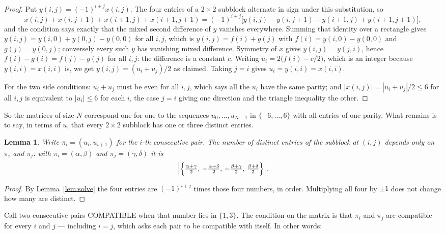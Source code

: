\documentclass[11pt,a4paper]{article}
\theoremstyle{plain}
\newtheorem{lemma}[theorem]{Lemma}
\theoremstyle{definition}
\begin{document}
\begin{proof}
Put $y(i,j)=(-1)^{i+j}x(i,j)$. The four entries of a $2\times2$ subblock alternate in sign
under this substitution, so
\[
x(i,j)+x(i,j{+}1)+x(i{+}1,j)+x(i{+}1,j{+}1)
=(-1)^{i+j}\bigl[y(i,j)-y(i,j{+}1)-y(i{+}1,j)+y(i{+}1,j{+}1)\bigr],
\]
and the condition says exactly that the mixed second difference of $y$ vanishes everywhere.
Summing that identity over a rectangle gives
$y(i,j)=y(i,0)+y(0,j)-y(0,0)$ for all $i,j$, which is $y(i,j)=f(i)+g(j)$ with
$f(i)=y(i,0)-y(0,0)$ and $g(j)=y(0,j)$; conversely every such $y$ has vanishing mixed
difference. Symmetry of $x$ gives $y(i,j)=y(j,i)$, hence $f(i)-g(i)=f(j)-g(j)$ for all $i,j$:
the difference is a constant $c$. Writing $u_i=2\bigl(f(i)-c/2\bigr)$, which is an integer
because $y(i,i)=x(i,i)$ is, we get $y(i,j)=(u_i+u_j)/2$ as claimed. Taking $j=i$ gives
$u_i=y(i,i)=x(i,i)$.

For the two side conditions: $u_i+u_j$ must be even for all $i,j$, which says all the $u_i$ have
the same parity; and $|x(i,j)|=|u_i+u_j|/2\le6$ for all $i,j$ is equivalent to $|u_i|\le6$
for each $i$, the case $j=i$ giving one direction and the triangle inequality the other.
\end{proof}

So the matrices of size $N$ correspond one for one to the sequences $u_0,\dots,u_{N-1}$ in
$\{-6,\dots,6\}$ with all entries of one parity. What remains is to say, in terms of $u$,
that every $2\times2$ subblock has one or three distinct entries.

\begin{lemma}\label{lem:block}
Write $\pi_i=(u_i,u_{i+1})$ for the $i$-th consecutive pair. The number of distinct entries of
the subblock at $(i,j)$ depends only on $\pi_i$ and $\pi_j$: with $\pi_i=(\alpha,\beta)$ and
$\pi_j=(\gamma,\delta)$ it is
\[
\Bigl|\Bigl\{\tfrac{\alpha+\gamma}{2},\,-\tfrac{\alpha+\delta}{2},\,
-\tfrac{\beta+\gamma}{2},\,\tfrac{\beta+\delta}{2}\Bigr\}\Bigr| .
\]
\end{lemma}

\begin{proof}
By Lemma~\ref{lem:solve} the four entries are $(-1)^{i+j}$ times those four numbers, in
order. Multiplying all four by $\pm1$ does not change how many are distinct.
\end{proof}

Call two consecutive pairs COMPATIBLE when that number lies in $\{1,3\}$. The condition on the
matrix is that $\pi_i$ and $\pi_j$ are compatible for every $i$ and $j$ --- including $i=j$,
which asks each pair to be compatible with itself. In other words:
\end{document}
